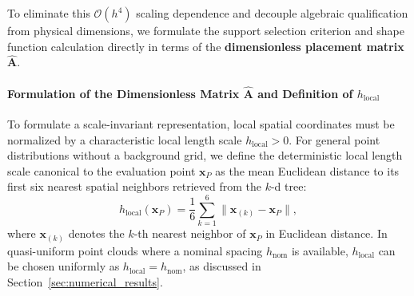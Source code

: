 \documentclass[preprint,12pt]{elsarticle}
\begin{document}
To eliminate this $\mathcal{O}(h^4)$ scaling dependence and decouple algebraic qualification from physical dimensions, we formulate the support selection criterion and shape function calculation directly in terms of the \textbf{dimensionless placement matrix} $\widehat{\mathbf{A}}$.

\paragraph{Formulation of the Dimensionless Matrix $\widehat{\mathbf{A}}$ and Definition of $h_{\mathrm{local}}$}
To formulate a scale-invariant representation, local spatial coordinates must be normalized by a characteristic local length scale $h_{\mathrm{local}} > 0$. For general point distributions without a background grid, we define the deterministic local length scale canonical to the evaluation point $\mathbf{x}_P$ as the mean Euclidean distance to its first six nearest spatial neighbors retrieved from the $k$-d tree:
\begin{equation}
    h_{\mathrm{local}}(\mathbf{x}_P) = \frac{1}{6} \sum_{k=1}^6 \|\mathbf{x}_{(k)} - \mathbf{x}_P\|,
    \label{eq:h_local_canonical}
\end{equation}
where $\mathbf{x}_{(k)}$ denotes the $k$-th nearest neighbor of $\mathbf{x}_P$ in Euclidean distance. In quasi-uniform point clouds where a nominal spacing $h_{\mathrm{nom}}$ is available, $h_{\mathrm{local}}$ can be chosen uniformly as $h_{\mathrm{local}} = h_{\mathrm{nom}}$, as discussed in Section~\ref{sec:numerical_results}.
\end{document}
